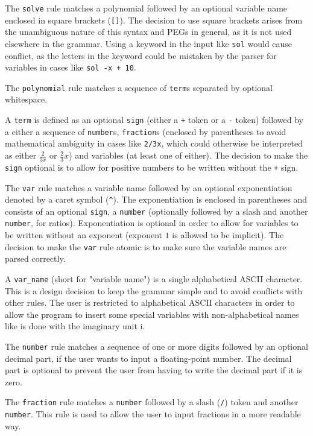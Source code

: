 The \verb|solve| rule matches a polynomial followed by an optional variable name enclosed in square brackets (\verb|[]|). The decision to use square brackets arises from the unambiguous nature of this syntax and PEGs in general, as it is not used elsewhere in the grammar. Using a keyword in the input like \verb|sol| would cause conflict, as the letters in the keyword could be mistaken by the parser for variables in cases like \verb|sol -x + 10|.

The \verb|polynomial| rule matches a sequence of \verb|term|s separated by optional whitespace.

A \verb|term| is defined as an optional \verb|sign| (either a \verb|+| token or a \verb|-| token) followed by a either a sequence of \verb|number|s, \verb|fraction|s (enclosed by parentheses to avoid mathematical ambiguity in cases like \verb|2/3x|, which could otherwise be interpreted as either $\frac{2}{3x}$ or $\frac{2}{3}x$) and variables (at least one of either). The decision to make the \verb|sign| optional is to allow for positive numbers to be written without the \verb|+| sign.

The \verb|var| rule matches a variable name followed by an optional exponentiation denoted by a caret symbol (\verb|^|). The exponentiation is enclosed in parentheses and consists of an optional \verb|sign|, a \verb|number| (optionally followed by a slash and another \verb|number|, for ratios). Exponentiation is optional in order to allow for variables to be written without an exponent (exponent $1$ is allowed to be implicit). The decision to make the \verb|var| rule atomic is to make sure the variable names are parsed correctly.

A \verb|var_name| (short for "variable name") is a single alphabetical ASCII character. This is a design decision to keep the grammar simple and to avoid conflicts with other rules. The user is restricted to alphabetical ASCII characters in order to allow the program to insert some special variables with non-alphabetical names like is done with the imaginary unit $\mathrm{i}$.

The \verb|number| rule matches a sequence of one or more digits followed by an optional decimal part, if the user wants to input a floating-point number. The decimal part is optional to prevent the user from having to write the decimal part if it is zero.

The \verb|fraction| rule matches a \verb|number| followed by a slash (\verb|/|) token and another \verb|number|. This rule is used to allow the user to input fractions in a more readable way.

